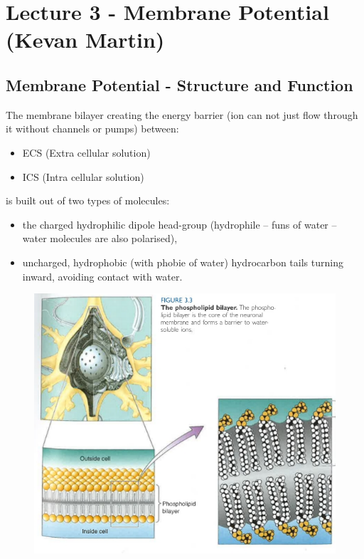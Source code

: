 \documentclass[english,11pt]{article}
\begin{document}
\newpage
\section{Lecture 3 - Membrane Potential (Kevan Martin)}


\subsection{Membrane Potential - Structure and Function}
The membrane bilayer creating the energy barrier (ion can not just flow through it without channels or pumps) between: 
\begin{itemize}
\item ECS (Extra cellular solution)
\item ICS (Intra cellular solution)
\end{itemize}

is built out of two types of molecules:
\begin{itemize}
\item the charged hydrophilic dipole head-group (hydrophile -- funs of water -- water molecules are also polarised),
\item uncharged, hydrophobic (with phobie of water) hydrocarbon tails turning inward, avoiding contact with water.
\end{itemize}

\begin{figure}[h]
\begin{center}
\includegraphics[scale=0.8]{images/3_1.jpg}
\end{center}
\end{figure}
\end{document}
